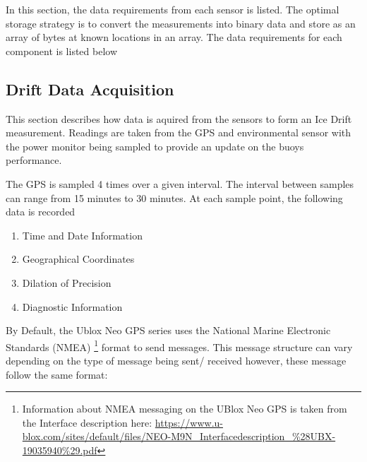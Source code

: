 In this section, the data requirements from each sensor is listed. The optimal storage strategy is to convert the measurements into binary data and store as an array of bytes at known locations in an array. The data requirements for each component is listed below

\subsection{Drift Data Acquisition}
This section describes how data is aquired from the sensors to form an Ice Drift measurement. Readings are taken from the GPS and environmental sensor with the power monitor being sampled to provide an update on the buoys performance.\par 

The GPS is sampled 4 times over a given interval. The interval between samples can range from 15 minutes to 30 minutes. At each sample point, the following data is recorded

\begin{enumerate}
    \item Time and Date Information
    \item Geographical Coordinates
    \item Dilation of Precision
    \item Diagnostic Information
\end{enumerate}

By Default, the Ublox Neo GPS series uses the National Marine Electronic Standards (NMEA) \footnote{Information about NMEA messaging on the UBlox Neo GPS is taken from the Interface description here: \url{https://www.u-blox.com/sites/default/files/NEO-M9N_Interfacedescription_\%28UBX-19035940\%29.pdf}} format to send messages. This message structure can vary depending on the type of message being sent/ received however, these message follow the same format:


